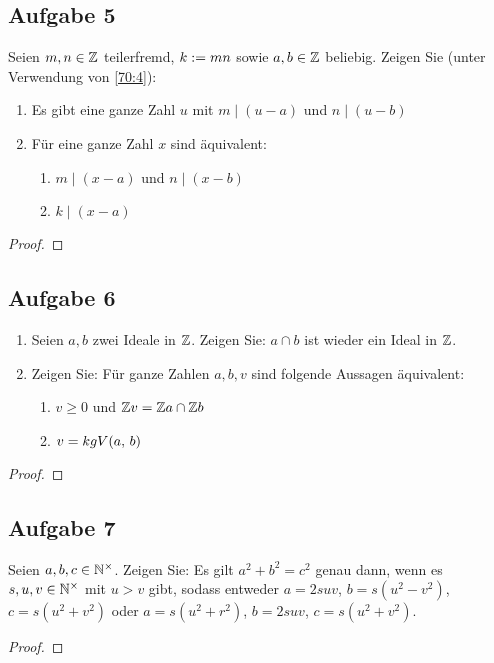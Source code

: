 \subsection{Aufgabe 5}
Seien $m,n \in \mathbb{Z}{}$ teilerfremd, $k :={} mn$ sowie
$a,b \in \mathbb{Z}{}$ beliebig. Zeigen Sie (unter Verwendung von \autoref{70:4}):
\begin{enumerate}[label=\alph*)]
  \item Es gibt eine ganze Zahl $u$ mit $m \mid (u - a)$ und $n \mid (u - b)$
  \item Für eine ganze Zahl $x$ sind äquivalent:
        \begin{enumerate}[label=\roman*)]
          \item $m \mid (x - a)$ und $n \mid (x - b)$
          \item $k \mid (x - a)$
        \end{enumerate}
\end{enumerate}
\begin{proof}
\end{proof}

\subsection{Aufgabe 6}
\begin{enumerate}[label=\alph*)]
  \item Seien $a,b$ zwei Ideale in $\mathbb{Z}{}$. Zeigen Sie:
        $a \cap b$ ist wieder ein Ideal in $\mathbb{Z}{}$.
  \item Zeigen Sie: Für ganze Zahlen $a,b,v$ sind folgende Aussagen äquivalent:
        \begin{enumerate}[label=\roman*)]
          \item $v \geq 0$ und
                $\mathbb{Z}{}v = \mathbb{Z}{}a \cap \mathbb{Z}{}b$
          \item $v = kgV(a,\,b)$
        \end{enumerate}
\end{enumerate}
\begin{proof}
\end{proof}

\subsection{Aufgabe 7}
Seien $a,b,c \in \mathbb{N}^\times{}$. Zeigen Sie: Es gilt $a^2 + b^2 = c^2$ genau dann,
wenn es $s,u,v \in \mathbb{N}^\times{}$ mit $u > v$ gibt, sodass entweder
$a = 2suv$, $b = s(u^2 - v^2)$, $c = s(u^2 + v^2)$ oder
$a = s(u^2 + r^2)$, $b = 2suv$, $c = s(u^2 + v^2)$.
\begin{proof}
\end{proof}
